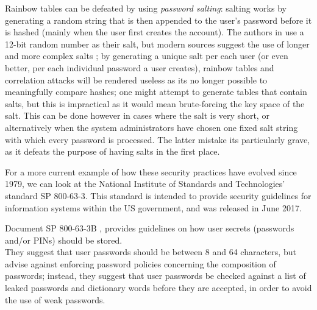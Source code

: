 Rainbow tables can be defeated by using \emph{password salting}: salting works by generating a random string that is then appended to the user's password before it is hashed (mainly when the user first creates the account). The authors in \cite{Thompson1979} use a 12-bit random number as their salt, but modern sources suggest the use of longer and more complex salts \cite{NIST_2017}; by generating a unique salt per each user (or even better, per each individual password a user creates), rainbow tables and correlation attacks will be rendered useless as its no longer possible to meaningfully compare hashes; one might attempt to generate tables that contain salts, but this is impractical as it would mean brute-forcing the key space of the salt.
This can be done however in cases where the salt is very short, or alternatively when the system administrators have chosen one fixed salt string with which every password is processed.
The latter mistake its particularly grave, as it defeats the purpose of having salts in the first place.
   

For a more current example of how these security practices have evolved since 1979, we can look at the National Institute of Standards and Technologies' standard SP 800-63-3.
This standard is intended to provide security guidelines for information systems within the US government, and was released in June 2017.

Document SP 800-63-3B \cite{NIST_2017}, provides guidelines on how user secrets (passwords and/or PINs) should be stored.\\
They suggest that user passwords should be between 8 and 64 characters, but advise against enforcing password policies concerning the composition of passwords; instead, they suggest that user passwords be checked against a list of leaked passwords and dictionary words before they are accepted, in order to avoid the use of weak passwords.

